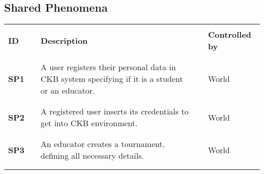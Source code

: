 \newpage

\subsection{Shared Phenomena}

\renewcommand{\arraystretch}{0.5}
\begin{longtable}[H]{l l p{8.5cm} l l}
    \hline
                  &        &                                                                                                                                &        &                        \\
    \textbf{ID}   & \vline & \textbf{Description}                                                                                                           & \vline & \textbf{Controlled by} \\
                  &        &                                                                                                                                &        &                        \\\hline & & \\
    \textbf{SP1}  & \vline & A user registers their personal data in CKB system specifying if it is a student or an educator.                               & \vline & World                  \\
                  &        &                                                                                                                                &        &                        \\\hline & & \\
    \textbf{SP2}  & \vline & A registered user inserts its credentials to get into CKB environment.                                                         & \vline & World                  \\
                  &        &                                                                                                                                &        &                        \\\hline & & \\
    \textbf{SP3}  & \vline & An educator creates a tournament, defining all necessary details.                                                              & \vline & World                  \\
                  &        &                                                                                                                                &        &                        \\\hline & & \\

\end{longtable}
